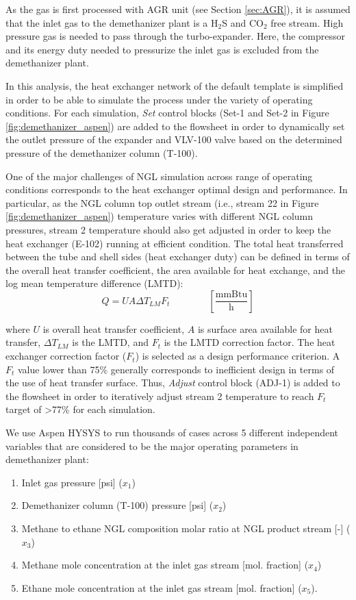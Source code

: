 \documentclass[11pt]{report}
\newcommand{\eqnunitfrac}[2]{\quad\quad \scriptstyle{\left[\frac{\text{#1}}{\text{#2}}\right]}}
\begin{document}
As the gas is first processed with AGR unit (see Section \ref{sec:AGR}), it is assumed that the inlet gas to the demethanizer plant is a H$_2$S and CO$_2$ free stream. High pressure gas is needed to pass through the turbo-expander. Here, the compressor and its energy duty needed to pressurize the inlet gas is excluded from the demethanizer plant. 

In this analysis, the heat exchanger network of the default template is simplified in order to be able to simulate the process under the variety of operating conditions. For each simulation, \emph{Set} control blocks (Set-1 and Set-2 in Figure \ref{fig:demethanizer_aspen}) are added to the flowsheet in order to dynamically set the outlet pressure of the expander and VLV-100 valve based on the determined pressure of the demethanizer column (T-100). 

One of the major challenges of NGL simulation across range of operating conditions corresponds to the heat exchanger optimal design and performance. In particular, as the NGL column top outlet stream (i.e., stream 22 in Figure \ref{fig:demethanizer_aspen}) temperature varies with different NGL column pressures, stream 2 temperature should also get adjusted in order to keep the heat exchanger (E-102) running at efficient condition. The total heat transferred between the tube and shell sides (heat exchanger duty) can be defined in terms of the overall heat transfer coefficient, the area available for heat exchange, and the log mean temperature difference (LMTD):
\begin{equation} \label{eq:shell_and_tube_HE}
Q=UA\Delta T_{LM}F_{t} \quad\quad\eqnunitfrac{mmBtu}{h}
\end{equation}

where $U$ is overall heat transfer coefficient, $A$ is surface area available for heat transfer, $\Delta T_{LM}$ is the LMTD, and $F_{t}$ is the LMTD correction factor. The heat exchanger correction factor ($F_{t}$) is selected as a design performance criterion. A $F_{t}$ value lower than 75\% generally corresponds to inefficient design in terms of the use of heat transfer surface. Thus, \emph{Adjust} control block (ADJ-1) is added to the flowsheet in order to iteratively adjust stream 2 temperature to reach $F_{t}$ target of >77\% for each simulation.       

We use Aspen HYSYS to run thousands of cases across 5 different independent variables that are considered to be the major operating parameters in demethanizer plant:
\begin{enumerate}
\item Inlet gas pressure [psi] ($x_1$)
\item Demethanizer column (T-100) pressure [psi] ($x_2$)
\item Methane to ethane NGL composition molar ratio at NGL product stream [-] ($x_3$)
\item Methane mole concentration at the inlet gas stream [mol. fraction] ($x_4$)
\item Ethane mole concentration at the inlet gas stream [mol. fraction] ($x_5$).
\end{enumerate}
\end{document}
